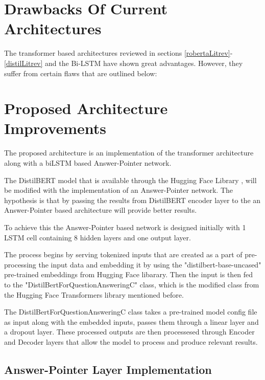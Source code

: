 \documentclass[a4paper,12pt]{report}
\begin{document}
       \section{Drawbacks Of Current Architectures}\label{c41}

       The transformer based architectures reviewed in sections \ref{robertaLitrev}- \ref{distilLitrev} and the Bi-LSTM \citep{bilstmHerman} have shown great advantages. However, they suffer from certain flaws that are outlined below:
       
       
       \section{Proposed Architecture Improvements}\label{c42}

            The proposed architecture is an implementation of the transformer architecture along with a biLSTM based Answer-Pointer network. 
            
            The DistilBERT model that is available through the Hugging Face Library \citep{hfTransformers}, will be modified with the implementation of an Answer-Pointer network. The hypothesis is that by passing the results from DistilBERT encoder layer to the an Answer-Pointer based architecture will provide better results. 
            
            To achieve this the Answer-Pointer based network is designed initially with 1 LSTM cell containing 8 hidden layers and one output layer.
            
            The process begins by serving tokenized inputs that are created as a part of pre-processing the input data and embedding it by using the "distilbert-base-uncased" pre-trained embeddings from Hugging Face libarary. Then the input is then fed to the "DistilBertForQuestionAnsweringC" class, which is the modified class from the Hugging Face Transformers library mentioned before.
            
            The DistilBertForQuestionAnsweringC class takes a pre-trained model config file as input along with the embedded inputs, passes them through a linear layer and a dropout layer. These processed outputs are then processesed through Encoder and Decoder layers that allow the model to process and produce relevant results.
            
            \subsection{Answer-Pointer Layer Implementation}
            
\end{document}
